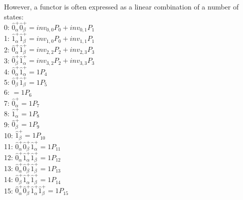 \documentclass[14pt]{article}
\begin{document}
    However, a functor is often expressed as a linear combination of a number of states: \\ 
    0: $\hat{0}_{\alpha}^{+}\hat{0}_{\beta}^{+} = {{inv}_{0,0}{P}_{0}}+{{inv}_{0,1}{P}_{1}} $ \\ 
    1: $\hat{1}_{\alpha}^{+}\hat{1}_{\beta}^{+} = {{inv}_{1,0}{P}_{0}}+{{inv}_{1,1}{P}_{1}} $ \\ 
    2: $\hat{0}_{\alpha}^{+}\hat{1}_{\beta}^{+} = {{inv}_{2,2}{P}_{2}}+{{inv}_{2,3}{P}_{3}} $ \\ 
    3: $\hat{0}_{\beta}^{+}\hat{1}_{\alpha}^{+} = {{inv}_{3,2}{P}_{2}}+{{inv}_{3,3}{P}_{3}} $ \\ 
    4: $\hat{0}_{\alpha}^{+}\hat{1}_{\alpha}^{+} = {1{P}_{4}} $ \\ 
    5: $\hat{0}_{\beta}^{+}\hat{1}_{\beta}^{+} = {1{P}_{5}} $ \\ 
    6: $ = {1{P}_{6}} $ \\ 
    7: $\hat{0}_{\alpha}^{+} = {1{P}_{7}} $ \\ 
    8: $\hat{1}_{\alpha}^{+} = {1{P}_{8}} $ \\ 
    9: $\hat{0}_{\beta}^{+} = {1{P}_{9}} $ \\ 
    10: $\hat{1}_{\beta}^{+} = {1{P}_{10}} $ \\ 
    11: $\hat{0}_{\alpha}^{+}\hat{0}_{\beta}^{+}\hat{1}_{\alpha}^{+} = {1{P}_{11}} $ \\ 
    12: $\hat{0}_{\alpha}^{+}\hat{1}_{\alpha}^{+}\hat{1}_{\beta}^{+} = {1{P}_{12}} $ \\ 
    13: $\hat{0}_{\alpha}^{+}\hat{0}_{\beta}^{+}\hat{1}_{\beta}^{+} = {1{P}_{13}} $ \\ 
    14: $\hat{0}_{\beta}^{+}\hat{1}_{\alpha}^{+}\hat{1}_{\beta}^{+} = {1{P}_{14}} $ \\ 
    15: $\hat{0}_{\alpha}^{+}\hat{0}_{\beta}^{+}\hat{1}_{\alpha}^{+}\hat{1}_{\beta}^{+} = {1{P}_{15}} $ \\ 
    
\end{document}
